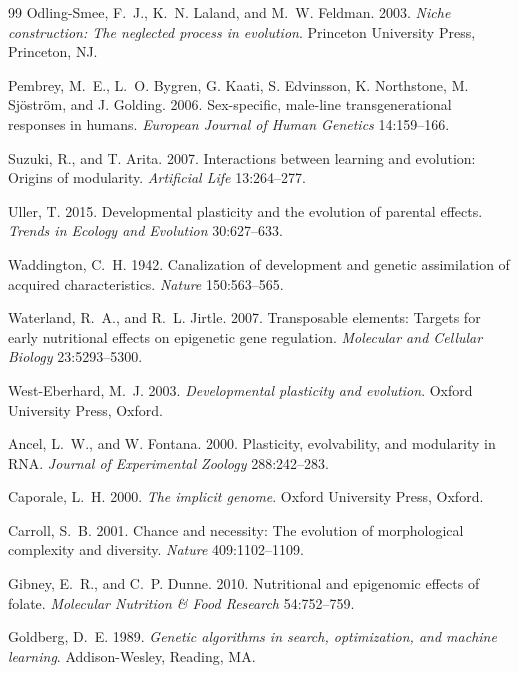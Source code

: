 \documentclass[11pt]{article}
\begin{document}
\begin{thebibliography}{99}
Odling-Smee, F.~J., K.~N. Laland, and M.~W. Feldman. 2003. \textit{Niche construction: The neglected process in evolution}. Princeton University Press, Princeton, NJ.

Pembrey, M.~E., L.~O. Bygren, G. Kaati, S. Edvinsson, K. Northstone, M. Sj\"{o}str\"{o}m, and J. Golding. 2006. Sex-specific, male-line transgenerational responses in humans. \textit{European Journal of Human Genetics} 14:159--166.

Suzuki, R., and T. Arita. 2007. Interactions between learning and evolution: Origins of modularity. \textit{Artificial Life} 13:264--277.

Uller, T. 2015. Developmental plasticity and the evolution of parental effects. \textit{Trends in Ecology and Evolution} 30:627--633.

Waddington, C.~H. 1942. Canalization of development and genetic assimilation of acquired characteristics. \textit{Nature} 150:563--565.

Waterland, R.~A., and R.~L. Jirtle. 2007. Transposable elements: Targets for early nutritional effects on epigenetic gene regulation. \textit{Molecular and Cellular Biology} 23:5293--5300.

West-Eberhard, M.~J. 2003. \textit{Developmental plasticity and evolution}. Oxford University Press, Oxford.

Ancel, L.~W., and W. Fontana. 2000. Plasticity, evolvability, and modularity in RNA. \textit{Journal of Experimental Zoology} 288:242--283.

Caporale, L.~H. 2000. \textit{The implicit genome}. Oxford University Press, Oxford.

Carroll, S.~B. 2001. Chance and necessity: The evolution of morphological complexity and diversity. \textit{Nature} 409:1102--1109.

Gibney, E.~R., and C.~P. Dunne. 2010. Nutritional and epigenomic effects of folate. \textit{Molecular Nutrition \& Food Research} 54:752--759.

Goldberg, D.~E. 1989. \textit{Genetic algorithms in search, optimization, and machine learning}. Addison-Wesley, Reading, MA.


\end{thebibliography}
\end{document}
